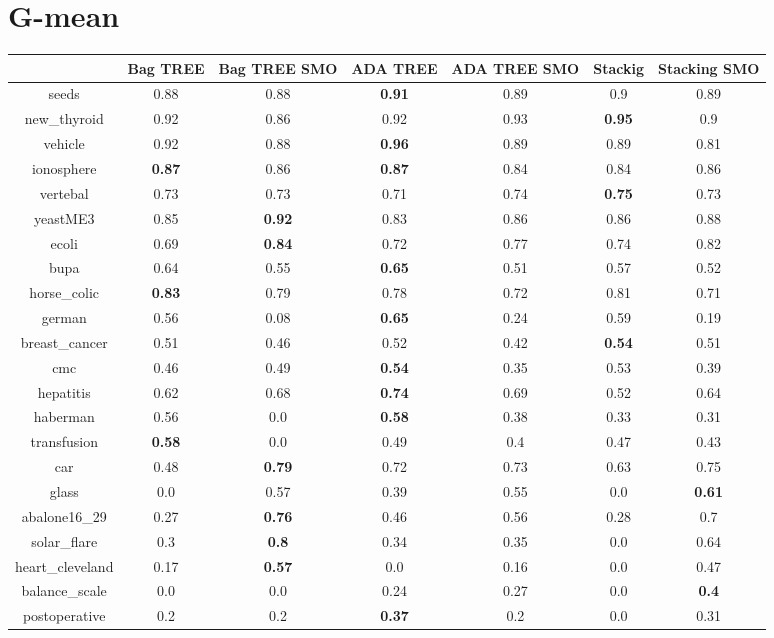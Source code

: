 \documentclass{article}%
\begin{document}
\section*{G{-}mean}%
\begin{tabular}{c|cccccc}%
&Bag TREE&Bag TREE SMO&ADA TREE&ADA TREE SMO&Stackig&Stacking SMO\\%
\hline%
seeds&0.88&0.88&\textbf{0.91}&0.89&0.9&0.89\\%
new\_thyroid&0.92&0.86&0.92&0.93&\textbf{0.95}&0.9\\%
vehicle&0.92&0.88&\textbf{0.96}&0.89&0.89&0.81\\%
ionosphere&\textbf{0.87}&0.86&\textbf{0.87}&0.84&0.84&0.86\\%
vertebal&0.73&0.73&0.71&0.74&\textbf{0.75}&0.73\\%
yeastME3&0.85&\textbf{0.92}&0.83&0.86&0.86&0.88\\%
ecoli&0.69&\textbf{0.84}&0.72&0.77&0.74&0.82\\%
bupa&0.64&0.55&\textbf{0.65}&0.51&0.57&0.52\\%
horse\_colic&\textbf{0.83}&0.79&0.78&0.72&0.81&0.71\\%
german&0.56&0.08&\textbf{0.65}&0.24&0.59&0.19\\%
breast\_cancer&0.51&0.46&0.52&0.42&\textbf{0.54}&0.51\\%
cmc&0.46&0.49&\textbf{0.54}&0.35&0.53&0.39\\%
hepatitis&0.62&0.68&\textbf{0.74}&0.69&0.52&0.64\\%
haberman&0.56&0.0&\textbf{0.58}&0.38&0.33&0.31\\%
transfusion&\textbf{0.58}&0.0&0.49&0.4&0.47&0.43\\%
car&0.48&\textbf{0.79}&0.72&0.73&0.63&0.75\\%
glass&0.0&0.57&0.39&0.55&0.0&\textbf{0.61}\\%
abalone16\_29&0.27&\textbf{0.76}&0.46&0.56&0.28&0.7\\%
solar\_flare&0.3&\textbf{0.8}&0.34&0.35&0.0&0.64\\%
heart\_cleveland&0.17&\textbf{0.57}&0.0&0.16&0.0&0.47\\%
balance\_scale&0.0&0.0&0.24&0.27&0.0&\textbf{0.4}\\%
postoperative&0.2&0.2&\textbf{0.37}&0.2&0.0&0.31\\%
\end{tabular}

%
\end{document}
